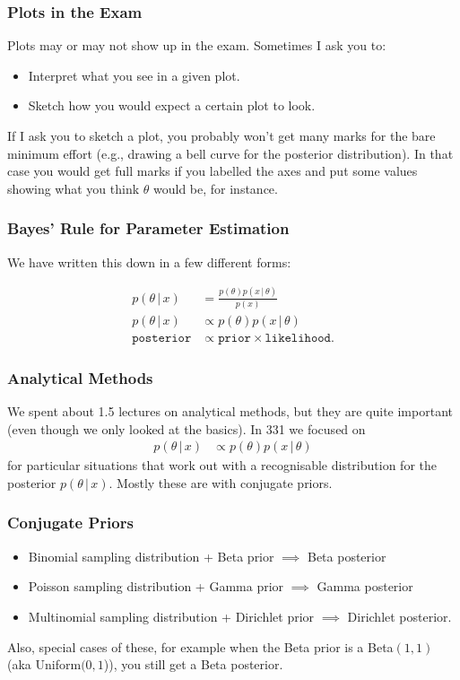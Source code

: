 \documentclass{beamer}
\newcommand{\given}{\,|\,}
\begin{document}
\begin{frame}
\frametitle{Plots in the Exam}
Plots may or may not show up in the exam. Sometimes I ask you to:
\begin{itemize}
\item Interpret what you see in a given plot.\pause
\item Sketch how you would expect a certain plot to look.\pause
\end{itemize}
If I ask you to sketch a plot, you probably won't get many marks for the
bare minimum effort (e.g., drawing a bell curve for the posterior distribution).
In that case you would get full marks if you labelled the axes and put some values
showing what you think $\theta$ would be, for instance.

\end{frame}


\begin{frame}
\frametitle{Bayes' Rule for Parameter Estimation}
We have written this down in a few different forms:

\begin{align}
p(\theta \given x) &= \frac{p(\theta)p(x\given \theta)}{p(x)} \\
p(\theta \given x) &\propto p(\theta)p(x\given \theta) \\
\texttt{posterior} &\propto \texttt{prior} \times \texttt{likelihood}.
\end{align}

\end{frame}

\begin{frame}
\frametitle{Analytical Methods}
We spent about 1.5 lectures on analytical methods, but they are quite important
(even though we only looked at the basics). In 331 we focused on
\begin{align}
p(\theta \given x) &\propto p(\theta)p(x\given \theta)
\end{align}
for particular situations that work out with a recognisable distribution
for the posterior $p(\theta \given x)$. Mostly these are with conjugate priors.
\end{frame}


\begin{frame}
\frametitle{Conjugate Priors}

\begin{itemize}
\item Binomial sampling distribution + Beta prior $\implies$ Beta posterior \pause
\item Poisson sampling distribution + Gamma prior $\implies$ Gamma posterior \pause
\item Multinomial sampling distribution + Dirichlet prior $\implies$ Dirichlet posterior.
\end{itemize}
\pause
Also, special cases of these, for example when the Beta prior is a Beta$(1, 1)$
(aka Uniform$(0, 1$)), you still get a Beta posterior.

\end{frame}
\end{document}
